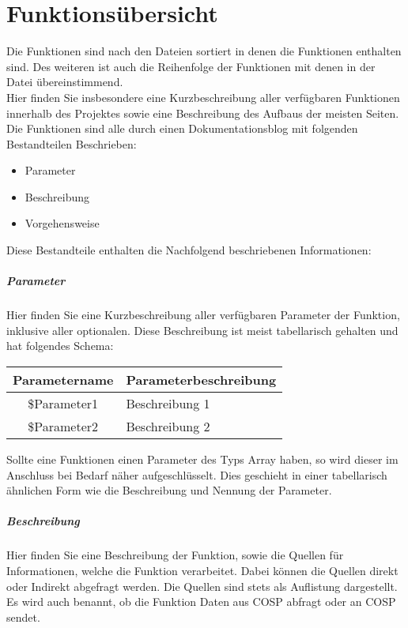 \setcounter{secnumdepth}{3}
\chapter{Funktionsübersicht}
Die Funktionen sind nach den Dateien sortiert in denen die Funktionen enthalten sind. Des weiteren ist auch die Reihenfolge der Funktionen mit denen in der Datei übereinstimmend. \\
Hier finden Sie insbesondere eine Kurzbeschreibung aller verfügbaren Funktionen innerhalb des Projektes sowie eine Beschreibung des Aufbaus der meisten Seiten. Die Funktionen sind alle durch einen Dokumentationsblog mit folgenden Bestandteilen Beschrieben:
\begin{itemize}
	\item Parameter
	\item Beschreibung
	\item Vorgehensweise
\end{itemize}
Diese Bestandteile enthalten die Nachfolgend beschriebenen Informationen:
\paragraph{Parameter} Hier finden Sie eine Kurzbeschreibung aller verfügbaren Parameter der Funktion, inklusive aller optionalen. Diese Beschreibung ist meist tabellarisch gehalten und hat folgendes Schema:
\begin{table}[H]
	\begin{tabular}{|c|p{11cm}|}
		\hline
		\textbf{Parametername} & \textbf{Parameterbeschreibung} \\ \hline
		\$Parameter1 & Beschreibung 1 \\ \hline
		\$Parameter2 & Beschreibung 2 \\ \hline
	\end{tabular}
\end{table}
Sollte eine Funktionen einen Parameter des Typs Array haben, so wird dieser im Anschluss bei Bedarf näher aufgeschlüsselt. Dies geschieht in einer tabellarisch ähnlichen Form wie die Beschreibung und Nennung der Parameter.
\paragraph{Beschreibung} Hier finden Sie eine Beschreibung der Funktion, sowie die Quellen für Informationen, welche die Funktion verarbeitet. Dabei können die Quellen direkt oder Indirekt abgefragt werden. Die Quellen sind stets als Auflistung dargestellt. Es wird auch benannt, ob die Funktion Daten aus {\glqq COSP\grqq} abfragt oder an {\glqq COSP\grqq} sendet.
